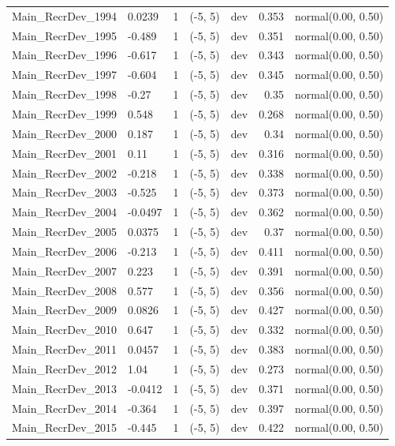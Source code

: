 \documentclass[
]{scrartcl}
\begin{document}
\begin{longtable}{llrllrl}
Main\_RecrDev\_1994 & 0.0239 & 1 & (-5, 5) & dev & 0.353 & normal(0.00, 0.50) \\ 
Main\_RecrDev\_1995 & -0.489 & 1 & (-5, 5) & dev & 0.351 & normal(0.00, 0.50) \\ 
Main\_RecrDev\_1996 & -0.617 & 1 & (-5, 5) & dev & 0.343 & normal(0.00, 0.50) \\ 
Main\_RecrDev\_1997 & -0.604 & 1 & (-5, 5) & dev & 0.345 & normal(0.00, 0.50) \\ 
Main\_RecrDev\_1998 & -0.27 & 1 & (-5, 5) & dev & 0.35 & normal(0.00, 0.50) \\ 
Main\_RecrDev\_1999 & 0.548 & 1 & (-5, 5) & dev & 0.268 & normal(0.00, 0.50) \\ 
Main\_RecrDev\_2000 & 0.187 & 1 & (-5, 5) & dev & 0.34 & normal(0.00, 0.50) \\ 
Main\_RecrDev\_2001 & 0.11 & 1 & (-5, 5) & dev & 0.316 & normal(0.00, 0.50) \\ 
Main\_RecrDev\_2002 & -0.218 & 1 & (-5, 5) & dev & 0.338 & normal(0.00, 0.50) \\ 
Main\_RecrDev\_2003 & -0.525 & 1 & (-5, 5) & dev & 0.373 & normal(0.00, 0.50) \\ 
Main\_RecrDev\_2004 & -0.0497 & 1 & (-5, 5) & dev & 0.362 & normal(0.00, 0.50) \\ 
Main\_RecrDev\_2005 & 0.0375 & 1 & (-5, 5) & dev & 0.37 & normal(0.00, 0.50) \\ 
Main\_RecrDev\_2006 & -0.213 & 1 & (-5, 5) & dev & 0.411 & normal(0.00, 0.50) \\ 
Main\_RecrDev\_2007 & 0.223 & 1 & (-5, 5) & dev & 0.391 & normal(0.00, 0.50) \\ 
Main\_RecrDev\_2008 & 0.577 & 1 & (-5, 5) & dev & 0.356 & normal(0.00, 0.50) \\ 
Main\_RecrDev\_2009 & 0.0826 & 1 & (-5, 5) & dev & 0.427 & normal(0.00, 0.50) \\ 
Main\_RecrDev\_2010 & 0.647 & 1 & (-5, 5) & dev & 0.332 & normal(0.00, 0.50) \\ 
Main\_RecrDev\_2011 & 0.0457 & 1 & (-5, 5) & dev & 0.383 & normal(0.00, 0.50) \\ 
Main\_RecrDev\_2012 & 1.04 & 1 & (-5, 5) & dev & 0.273 & normal(0.00, 0.50) \\ 
Main\_RecrDev\_2013 & -0.0412 & 1 & (-5, 5) & dev & 0.371 & normal(0.00, 0.50) \\ 
Main\_RecrDev\_2014 & -0.364 & 1 & (-5, 5) & dev & 0.397 & normal(0.00, 0.50) \\ 
Main\_RecrDev\_2015 & -0.445 & 1 & (-5, 5) & dev & 0.422 & normal(0.00, 0.50) \\ 

\end{longtable}
\end{document}
